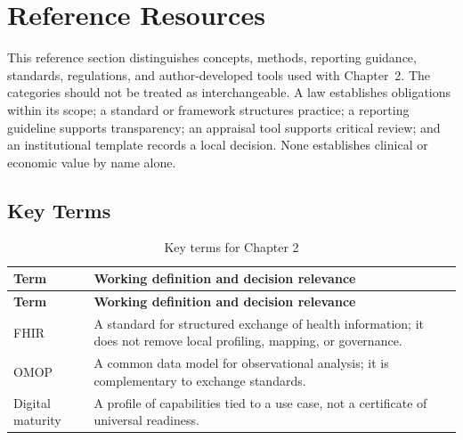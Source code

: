 \section{Reference Resources}
\label{sec:comp-ch02-reference}

This reference section distinguishes concepts, methods, reporting guidance,
standards, regulations, and author-developed tools used with Chapter~2. The
categories should not be treated as interchangeable. A law establishes obligations
within its scope; a standard or framework structures practice; a reporting guideline
supports transparency; an appraisal tool supports critical review; and an
institutional template records a local decision. None establishes clinical or
economic value by name alone. 

\subsection{Key Terms}
\begin{longtable}{@{}p{}p{}@{}}
\caption{Key terms for Chapter 2}
\label{tab:comp-ch02-key-terms}\\
\toprule
\textbf{Term} & \textbf{Working definition and decision relevance} \\
\midrule
\endfirsthead
\toprule
\textbf{Term} & \textbf{Working definition and decision relevance} \\
\midrule
\endhead
\bottomrule
\endlastfoot
FHIR & A standard for structured exchange of health information; it does not remove local profiling, mapping, or governance. \\
OMOP & A common data model for observational analysis; it is complementary to exchange standards. \\
Digital maturity & A profile of capabilities tied to a use case, not a certificate of universal readiness. \\
\end{longtable}

